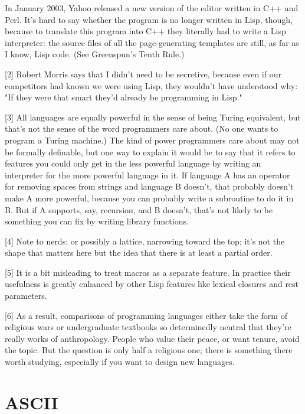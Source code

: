 \documentclass[10pt,twoside,openright]{memoir}
\begin{document}
In January 2003, Yahoo released a new version of the editor written in C++ and Perl. It's hard to say whether the program is no longer written in Lisp, though, because to translate this program into C++ they literally had to write a Lisp interpreter: the source files of all the page-generating templates are still, as far as I know, Lisp code. (See Greenspun's Tenth Rule.)

[2] Robert Morris says that I didn't need to be secretive, because even if our competitors had known we were using Lisp, they wouldn't have understood why: "If they were that smart they'd already be programming in Lisp."

[3] All languages are equally powerful in the sense of being Turing equivalent, but that's not the sense of the word programmers care about. (No one wants to program a Turing machine.) The kind of power programmers care about may not be formally definable, but one way to explain it would be to say that it refers to features you could only get in the less powerful language by writing an interpreter for the more powerful language in it. If language A has an operator for removing spaces from strings and language B doesn't, that probably doesn't make A more powerful, because you can probably write a subroutine to do it in B. But if A supports, say, recursion, and B doesn't, that's not likely to be something you can fix by writing library functions.

[4] Note to nerds: or possibly a lattice, narrowing toward the top; it's not the shape that matters here but the idea that there is at least a partial order.

[5] It is a bit misleading to treat macros as a separate feature. In practice their usefulness is greatly enhanced by other Lisp features like lexical closures and rest parameters.

[6] As a result, comparisons of programming languages either take the form of religious wars or undergraduate textbooks so determinedly neutral that they're really works of anthropology. People who value their peace, or want tenure, avoid the topic. But the question is only half a religious one; there is something there worth studying, especially if you want to design new languages.


\chapter{ASCII}
\end{document}
